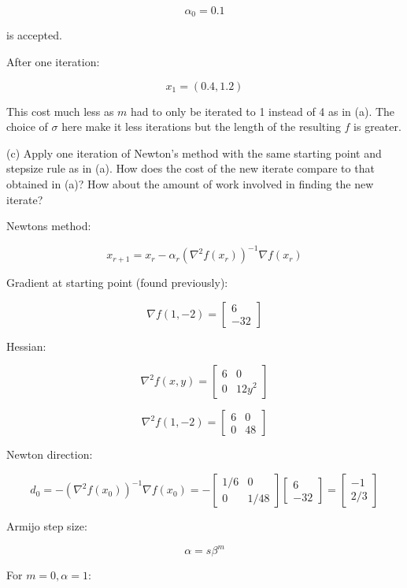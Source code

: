 \documentclass[11pt,letterpaper]{article}
\begin{document}
\begin{enumerate}
	\[
	\alpha_0 = 0.1
	\]

	is accepted.

	After one iteration:

	\[
	x_1 = (0.4, 1.2)
	\]

	This cost much less as $m$ had to only
	be iterated to 1 instead of 4 as in (a).
	The choice of $\sigma$ here make it less
	iterations but the length of the resulting
	$f$ is greater.

	(c) 
	Apply one iteration of Newton's method with the same
	starting point and stepsize rule as in (a). 
	How does the cost of the new iterate compare to that obtained
	in (a)?
	How about the amount of work involved in finding the new
	iterate?

	Newtons method:

	\[ x_{r+1} = 
	x_r - \alpha_r (\nabla^2 f(x_r))^{-1}
	\nabla f(x_r)
	\]

	Gradient at starting point (found previously):

	\[ \nabla f(1,-2) = 
	\begin{bmatrix} 6 \\ -32 \end{bmatrix}\]

	Hessian:

	\[ \nabla^2 f(x,y) = 
	\begin{bmatrix} 6 & 0 \\ 0 & 12y^2 \end{bmatrix}
	\]

	\[ \nabla^2 f(1, -2) =
	\begin{bmatrix} 6 & 0 \\ 0 & 48 \end{bmatrix}
	\]

	Newton direction:

	\[
	d_0 = 
	-(\nabla^2 f(x_0))^{-1} \nabla f(x_0) =
	- \begin{bmatrix} 1/6 & 0 \\
	0 & 1/48 \end{bmatrix}
	\begin{bmatrix} 6 \\ -32 \end{bmatrix}
	= \begin{bmatrix} -1 \\ 2/3 \end{bmatrix}
	\]

	Armijo step size:

	\[ \alpha = s \beta^m \]   

	For $m=0, \alpha = 1$:


\end{enumerate}
\end{document}
